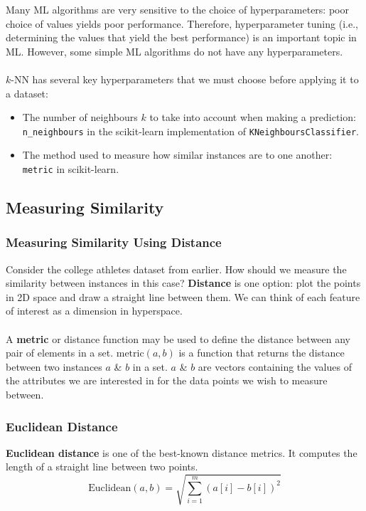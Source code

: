 \documentclass[a4paper,11pt]{article}
\begin{document}
Many ML algorithms are very sensitive to the choice of hyperparameters: poor choice of values yields poor performance.
Therefore, hyperparameter tuning (i.e., determining the values that yield the best performance) is an important topic in ML.
However, some simple ML algorithms do not have any hyperparameters.
\\\\
$k$-NN has several key hyperparameters that we must choose before applying it to a dataset:
\begin{itemize}
    \item   The number of neighbours $k$ to take into account when making a prediction: \texttt{n_neighbours} in the scikit-learn implementation of \texttt{KNeighboursClassifier}.
    \item   The method used to measure how similar instances are to one another: \texttt{metric} in scikit-learn.
\end{itemize}

\subsection{Measuring Similarity}
\subsubsection{Measuring Similarity Using Distance}
Consider the college athletes dataset from earlier.
How should we measure the similarity between instances in this case?
\textbf{Distance} is one option: plot the points in 2D space and draw a straight line between them.
We can think of each feature of interest as a dimension in hyperspace.
\\\\
A \textbf{metric} or distance function may be used to define the distance between any pair of elements in a set.
$\text{metric}(a,b)$ is a function that returns the distance between two instances $a$ \& $b$ in a set.
$a$ \& $b$ are vectors containing the values of the attributes we are interested in for the data points we wish to measure between.

\subsubsection{Euclidean Distance}
\textbf{Euclidean distance} is one of the best-known distance metrics.
It computes the length of a straight line between two points.
$$
\text{Euclidean}(a,b) = \sqrt{\sum^m_{i=1}(a[i] - b[i])^2}
$$
\end{document}
